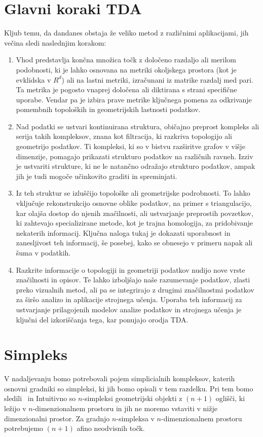 \section{Glavni koraki TDA}
Kljub temu, da dandanes obstaja že veliko metod z različnimi aplikacijami, jih večina sledi naslednjim korakom:
\begin{enumerate}
  \item Vhod predstavlja končna množica točk z določeno razdaljo ali merilom podobnosti, ki je lahko osnovana na metriki okoljskega prostora (kot je evklidska v $R^d$) ali na lastni metriki, izračunani iz matrike razdalj med pari. Ta metrika je pogosto vnaprej določena ali diktirana s strani specifične uporabe. Vendar pa je izbira prave metrike ključnega pomena za odkrivanje pomembnih topoloških in geometrijskih lastnosti podatkov.
  \item Nad podatki se ustvari kontinuirana struktura, običajno preprost kompleks ali serija takih kompleksov, znana kot filtracija, ki razkriva topologijo ali geometrijo podatkov. Ti kompleksi, ki so v bistvu razširitve grafov v višje dimenzije, pomagajo prikazati strukturo podatkov na različnih ravneh. Izziv je ustvariti strukture, ki ne le natančno odražajo strukturo podatkov, ampak jih je tudi mogoče učinkovito graditi in spreminjati.
  \item Iz teh struktur se izluščijo topološke ali geometrijske podrobnosti. To lahko vključuje rekonstrukcijo osnovne oblike podatkov, na primer s triangulacijo, kar olajša dostop do njenih značilnosti, ali ustvarjanje preprostih povzetkov, ki zahtevajo specializirane metode, kot je trajna homologija, za pridobivanje nekaterih informacij. Ključna naloga tukaj je dokazati uporabnost in zanesljivost teh informacij, še posebej, kako se obnesejo v primeru napak ali šuma v podatkih.
  \item Razkrite informacije o topologiji in geometriji podatkov nudijo nove vrste značilnosti in opisov. Te lahko izboljšajo naše razumevanje podatkov, zlasti preko vizualnih metod, ali pa se integrirajo z drugimi značilnostmi podatkov za širšo analizo in aplikacije strojnega učenja. Uporaba teh informacij za ustvarjanje prilagojenih modelov analize podatkov in strojnega učenja je ključni del izkoriščanja tega, kar ponujajo orodja TDA.\@
\end{enumerate}

\section{Simpleks}
V nadaljevanju bomo potrebovali pojem simplicialnih kompleksov, katerih osnovni gradniki so simpleksi, ki jih bomo opisali v tem razdelku. Pri tem bomo sledili~\cite{Urbančič_2020} in  Intuitivno so $n$-simpleksi geometrijski objekti z $(n + 1)$ oglišči, ki ležijo v $n$-dimenzionalnem prostoru in jih ne moremo vstaviti v nižje dimenzionalni prostor. Za gradnjo $n$-simpleksa v $n$-dimenzionalnem prostoru potrebujemo $(n + 1)$ afino neodvisnih točk.

